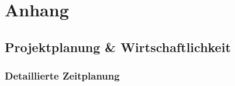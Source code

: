 \chapter{Anhang}


\section{Projektplanung \& Wirtschaftlichkeit}

\subsection{Detaillierte Zeitplanung}
\label{sec:zeitplanung_detail}

